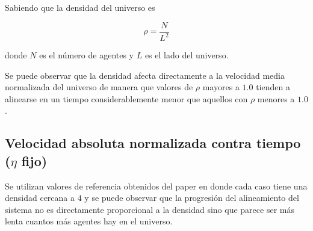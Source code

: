 \documentclass[a4paper]{article}
\begin{document}
            Sabiendo que la densidad del universo es

            \begin{equation}
                \rho = \frac{N}{L^2}
            \end{equation}

            donde $N$ es el número de agentes y $L$ es el lado del universo.


            Se puede observar que la densidad afecta directamente a la velocidad media normalizada del universo de manera que valores de $\rho$ mayores a $1.0$ tienden a alinearse en un tiempo considerablemente menor que aquellos con $\rho$ menores a $1.0$.

        \subsection{Velocidad absoluta normalizada contra tiempo ($\eta$ fijo)}



            Se utilizan valores de referencia obtenidos del paper en donde cada caso tiene una densidad cercana a $4$ y se puede observar que la progresión del alineamiento del sistema no es directamente proporcional a la densidad sino que parece ser más lenta cuantos más agentes hay en el universo.
\end{document}
